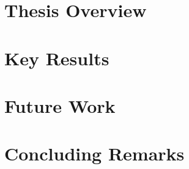 \section{Thesis Overview}

\section{Key Results}

\section{Future Work}
\section{Concluding Remarks}

